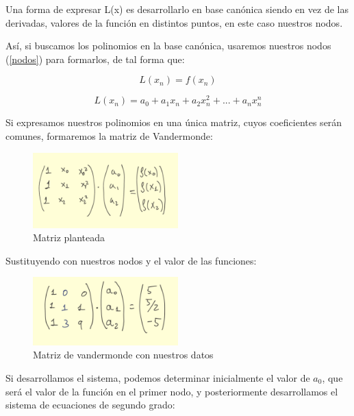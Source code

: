 \documentclass{article}
\begin{document}
Una forma de expresar L(x) es desarrollarlo en base canónica siendo en vez de las derivadas, valores de la función en distintos puntos, en este caso nuestros nodos.

Así, si buscamos los polinomios en la base canónica, usaremos nuestros nodos (\ref{nodos}) para formarlos, de tal forma que:

\begin{equation}
  L(x_{n}) = f(x_{n})
\end{equation}

\begin{equation}\label{ecuacion 7}
  L(x_{n}) = a_{0} + a_{1}x_{n} + a_{2}x_{n}^{2} + ... + a_{n}x_{n}^{n}
\end{equation}

Si expresamos nuestros polinomios en una única matriz, cuyos coeficientes serán comunes, formaremos la matriz de Vandermonde:


\begin{figure}[ht]
	\center
	\includegraphics[width=0.5\textwidth]{src/vandermatriz.jpg}
	\caption{Matriz planteada}
\end{figure}

\newpage

Sustituyendo con nuestros nodos y el valor de las funciones:

\begin{figure}[ht]
	\center
	\includegraphics[width=0.5\textwidth]{src/matrizdatos.jpg}
	\caption{Matriz de vandermonde con nuestros datos}
\end{figure}


Si desarrollamos el sistema, podemos determinar inicialmente el valor de $a_{0}$, que será el valor de la función en el primer nodo, y posteriormente desarrollamos el sistema de ecuaciones de segundo grado:
\end{document}
